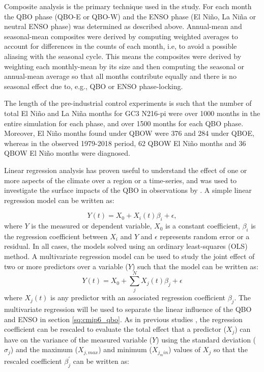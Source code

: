 Composite analysis is the primary technique used in the study. For each month the QBO phase (QBO-E or QBO-W) and the  ENSO phase (El Niño, La Niña or neutral ENSO phase) was determined as described above. Annual-mean and seasonal-mean composites were derived by computing weighted averages to account for differences in the counts of each month, i.e, to avoid a possible aliasing with the seasonal cycle. This means the composites were derived by weighting each monthly-mean by its size and then computing the seasonal or annual-mean average so that all months contribute equally and there is no seasonal effect due to, e.g., QBO or ENSO phase-locking.

The length of the pre-industrial control experiments is such that the number of total El Niño and La Niña months for GC3 N216-pi were over 1000 months in the entire simulation for each phase, and over 1500 months for each QBO phase. Moreover, El Niño months found under QBOW were 376 and 284 under QBOE, whereas in the observed 1979-2018 period, 62 QBOW El Niño months and 36 QBOW El Niño months were diagnosed.

Linear regression analysis has proven useful to understand the effect of one or more aspects of the climate over a region or a time-series, and was used to investigate the surface impacts of the QBO in observations by \cite{gray2018}. 
A simple linear regression model can be written as:

\begin{equation}
Y(t)=X_0+X_i(t)\beta_i + \epsilon,
\end{equation}
\noindent where $Y$ is the measured or dependent variable, $X_0$ is a constant coefficient, $\beta_i$ is the regression coefficient between $X_i$ and $Y$ and $\epsilon$ represents random error or a residual.  In all cases, the models solved using an ordinary least-squares (OLS) method.
A multivariate regression model can be used to study the joint effect of two or more predictors over a variable ($Y$) such that the model can be written as:
\begin{equation}
Y(t)=X_0+\sum_j^NX_j(t)\beta_j+\epsilon
\end{equation}
\noindent where $X_j(t)$ is any predictor with an associated regression coefficient $\beta_j$. The multivariate regression will be used to separate the linear influence of the QBO and ENSO in section \ref{sq:cmip6_qbo}.
As in previous studies \citep{gray2018,misios2019slowdown}, the regression coefficient can be rescaled to evaluate the total effect that a predictor ($X_j$) can have on the variance of the measured variable ($Y$) using the standard deviation ($\sigma_j$) and the maximum ($X_{j,max}$) and minimum ($X_{j_min}$) values of $X_j$ so that the rescaled coefficient $\beta_j^\prime$ can be written as:


